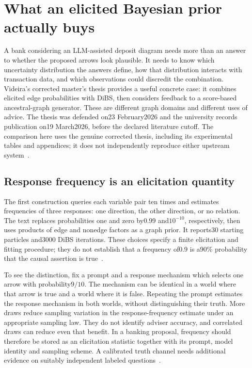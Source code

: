 \section{What an elicited Bayesian prior actually buys}
\label{exec18:bayesian-advice}
A bank considering an LLM-assisted deposit diagram needs more than an answer to whether the proposed arrows look plausible. It needs to know which uncertainty distribution the answers define, how that distribution interacts with transaction data, and which observations could discredit the combination. Videira's corrected master's thesis provides a useful concrete case: it combines elicited edge probabilities with DiBS, then considers feedback to a score-based ancestral-graph generator. These are different graph domains and different uses of advice. The thesis was defended on23 February2026 and the university records publication on19 March2026, before the declared literature cutoff. The comparison here uses the genuine corrected thesis, including its experimental tables and appendices; it does not independently reproduce either upstream system~\citep{exec18_videira_thesis}.

\subsection{Response frequency is an elicitation quantity}
The first construction queries each variable pair ten times and estimates frequencies of three responses: one direction, the other direction, or no relation. The text replaces probabilities one and zero by0.99 and$10^{-10}$, respectively, then uses products of edge and nonedge factors as a graph prior. It reports30 starting particles and3000 DiBS iterations. These choices specify a finite elicitation and fitting procedure; they do not establish that a frequency of0.9 is a90\% probability that the causal assertion is true~\citep{exec18_videira_thesis}.

To see the distinction, fix a prompt and a response mechanism which selects one arrow with probability$9/10$. The mechanism can be identical in a world where that arrow is true and a world where it is false. Repeating the prompt estimates the response mechanism in both worlds, without distinguishing their truth. More draws reduce sampling variation in the response-frequency estimate under an appropriate sampling law. They do not identify adviser accuracy, and correlated draws can reduce even that benefit. In a banking proposal, frequency should therefore be stored as an elicitation statistic together with its prompt, model identity and sampling scheme. A calibrated truth channel needs additional evidence on suitably independent labeled questions~\citep{exec18_bayesian_reference}.

